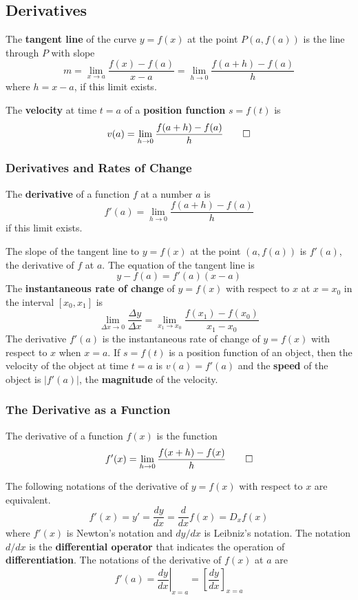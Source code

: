 \subsection{Derivatives}
\begin{definition}
    The \textbf{tangent line} of the curve \(y=f(x)\) at the point \(P(a, f(a))\)
    is the line through \(P\) with slope
    \[m=\lim_{x\to a}\frac{f(x)-f(a)}{x-a}=\lim_{h\to 0}\frac{f(a+h)-f(a)}{h}\]
    where \(h=x-a\), if this limit exists.
\end{definition}
\begin{definition}
    The \textbf{velocity} at time \(t=a\) of a \textbf{position function}
    \(s=f(t)\) is \[v(a)=\lim_{h\to 0}\frac{f(a+h)-f(a)}{h}\qedhere\]
\end{definition}

\subsubsection{Derivatives and Rates of Change}
\begin{definition}
    The \textbf{derivative} of a function \(f\) at a number \(a\) is
    \[f'(a)=\lim_{h\to 0}\frac{f(a+h)-f(a)}{h}\] if this limit exists.
\end{definition}
The slope of the tangent line to \(y=f(x)\) at the point \((a,f(a))\) is
\(f'(a)\), the derivative of \(f\) at \(a\).
The equation of the tangent line is \[y-f(a)=f'(a)(x-a)\]
The \textbf{instantaneous rate of change} of \(y=f(x)\) with respect to \(x\)
at \(x=x_0\) in the interval \([x_0,x_1]\) is
\[\lim_{\Delta x\to 0}\frac{\Delta y}{\Delta x}
=\lim_{x_1 \to x_0}\frac{f(x_1)-f(x_0)}{x_1-x_0}\]
The derivative \(f'(a)\) is the instantaneous rate of change of \(y=f(x)\)
with respect to \(x\) when \(x=a\).
If \(s=f(t)\) is a position function of an object, then the velocity of the
object at time \(t=a\) is \(v(a)=f'(a)\) and the \textbf{speed} of the
object is \(|f'(a)|\), the \textbf{magnitude} of the velocity.

\subsubsection{The Derivative as a Function}
\begin{definition}
    The derivative of a function \(f(x)\) is the function
    \[f'(x)=\lim_{h\to 0}\frac{f(x+h)-f(x)}{h}\qedhere\]
\end{definition}
The following notations of the derivative of \(y=f(x)\) with respect to \(x\) are
equivalent.
\[f'(x)=y'=\frac{dy}{dx}=\frac{d}{dx}f(x)=D_x f(x)\]
where \(f'(x)\) is Newton's notation and \(dy/dx\) is Leibniz's notation.
The notation \(d/dx\) is the \textbf{differential operator} that indicates the
operation of \textbf{differentiation}.
The notations of the derivative of \(f(x)\) at \(a\) are
\[f'(a)=\left.\frac{dy}{dx}\right|_{x=a}=\left[\frac{dy}{dx}\right]_{x=a}\]

